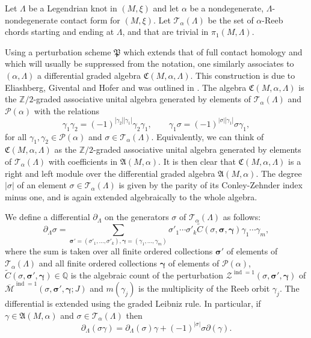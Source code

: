 \documentclass[JEP,XML,SOM,Unicode,NoFloatCountersInSection]{cedram}
\let\mathcal\mathscr
\theoremstyle{plain}
\theoremstyle{definition}
\numberwithin{equation}{subsection}
\let\op\operatorname
\let\bs\boldsymbol
\begin{document}
Let $\Lambda$ be a Legendrian knot in $(M,\xi)$ and let $\alpha$ be a nondegenerate, $\Lambda$-nondegenerate contact form for $(M,\xi)$. Let $\mathcal{T}_\alpha(\Lambda)$ be the set of $\alpha$-Reeb chords starting and ending at $\Lambda$, and that are trivial in $\pi_1(M,\Lambda)$.

Using a perturbation scheme ${\mathfrak P}$ which extends that of full contact homology and which will usually be suppressed from the notation, one similarly associates to $(\alpha,\Lambda)$ a differential graded algebra $\mathfrak{C}(M,\alpha,\Lambda)$. This construction is due to Eliashberg, Givental and Hofer and was outlined in \cite[\S 2.8]{SFT}. The algebra $\mathfrak{C}(M,\alpha,\Lambda)$ is the $\mathbb{Z}/2$\nobreakdash-graded associative unital algebra generated by elements of $\mathcal{T}_\alpha(\Lambda)$ and $\mathcal{P}(\alpha)$ with the relations
\[
\gamma_1 \gamma_2 = (-1)^{|\gamma_2||\gamma_1| } \gamma_2 \gamma_1, \qquad
\gamma_1 \sigma = (-1)^{|\sigma||\gamma_1|} \sigma \gamma_1,
\]
for all $\gamma_1,\gamma_2 \in \mathcal{P}(\alpha)$ and $\sigma \in \mathcal{T}_\alpha(\Lambda)$. Equivalently, we can think of $\mathfrak{C}(M,\alpha,\Lambda)$ as the $\mathbb{Z}/2$-graded associative unital algebra generated by elements of $\mathcal{T}_\alpha(\Lambda)$ with coefficients in $\mathfrak{A}(M,\alpha)$.
It is then clear that $\mathfrak{C}(M,\alpha,\Lambda)$ is a right and left module over the differential graded algebra $\mathfrak{A}(M,\alpha)$. The degree $|\sigma|$ of an element $\sigma\in \mathcal{T}_\alpha(\Lambda)$ is given by the parity of its Conley-Zehnder index minus one, and is again extended algebraically to the whole algebra.

We define a differential $\partial_{\Lambda}$ on the generators $\sigma$ of $\mathcal{T}_\alpha(\Lambda)$ as follows:
\begin{equation}%
\partial_{\Lambda} \sigma = \sum_{\bs\sigma'=(\sigma'_1,\dots,\sigma'_{k}),\bs\gamma=(\gamma_1,\dots,\gamma_m)} \sigma'_1\cdots\sigma'_{k} \widetilde{C}(\sigma,\bs\sigma,\bs\gamma)\gamma_1\cdots\gamma_m,
\end{equation}
where the sum is taken over all finite ordered collections $\bs\sigma'$ of elements of $\mathcal{T}_\alpha(\Lambda)$ and all finite ordered collections $\bs\gamma$ of elements of $\mathcal{P}(\alpha)$, $\widetilde{C}(\sigma,\bs\sigma',\bs\gamma) \in \mathbb{Q}$ is the algebraic count of the perturbation $\mathcal{Z}^{\op{ind}=1}(\sigma,\bs\sigma',\bs\gamma)$ of $\overline{\mathcal{M}}^{\op{ind}=1}(\sigma,\bs\sigma',\bs\gamma;J)$ and $m(\gamma_j)$ is the multiplicity of the Reeb orbit $\gamma_j$. The differential is extended using the graded Leibniz rule. In particular, if $\gamma \in \mathfrak{A}(M,\alpha)$ and $\sigma \in \mathcal{T}_\alpha(\Lambda)$ then
\begin{equation}%
\partial_{\Lambda} (\sigma\gamma) = \partial_{\Lambda}(\sigma)\gamma + (-1)^{|\sigma|}\sigma\partial(\gamma).
\end{equation}
\end{document}
